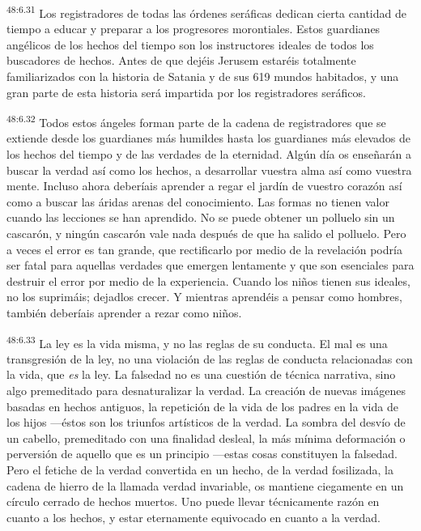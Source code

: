 \par
\textsuperscript{48:6.31} Los registradores de todas las órdenes seráficas dedican cierta cantidad de tiempo a educar y preparar a los progresores morontiales. Estos guardianes angélicos de los hechos del tiempo son los instructores ideales de todos los buscadores de hechos. Antes de que dejéis Jerusem estaréis totalmente familiarizados con la historia de Satania y de sus 619 mundos habitados, y una gran parte de esta historia será impartida por los registradores seráficos.

\par
\textsuperscript{48:6.32} Todos estos ángeles forman parte de la cadena de registradores que se extiende desde los guardianes más humildes hasta los guardianes más elevados de los hechos del tiempo y de las verdades de la eternidad. Algún día os enseñarán a buscar la verdad así como los hechos, a desarrollar vuestra alma así como vuestra mente. Incluso ahora deberíais aprender a regar el jardín de vuestro corazón así como a buscar las áridas arenas del conocimiento. Las formas no tienen valor cuando las lecciones se han aprendido. No se puede obtener un polluelo sin un cascarón, y ningún cascarón vale nada después de que ha salido el polluelo. Pero a veces el error es tan grande, que rectificarlo por medio de la revelación podría ser fatal para aquellas verdades que emergen lentamente y que son esenciales para destruir el error por medio de la experiencia. Cuando los niños tienen sus ideales, no los suprimáis; dejadlos crecer. Y mientras aprendéis a pensar como hombres, también deberíais aprender a rezar como niños.

\par
\textsuperscript{48:6.33} La ley es la vida misma, y no las reglas de su conducta. El mal es una transgresión de la ley, no una violación de las reglas de conducta relacionadas con la vida, que \textit{es} la ley. La falsedad no es una cuestión de técnica narrativa, sino algo premeditado para desnaturalizar la verdad. La creación de nuevas imágenes basadas en hechos antiguos, la repetición de la vida de los padres en la vida de los hijos ---éstos son los triunfos artísticos de la verdad. La sombra del desvío de un cabello, premeditado con una finalidad desleal, la más mínima deformación o perversión de aquello que es un principio ---estas cosas constituyen la falsedad. Pero el fetiche de la verdad convertida en un hecho, de la verdad fosilizada, la cadena de hierro de la llamada verdad invariable, os mantiene ciegamente en un círculo cerrado de hechos muertos. Uno puede llevar técnicamente razón en cuanto a los hechos, y estar eternamente equivocado en cuanto a la verdad.

